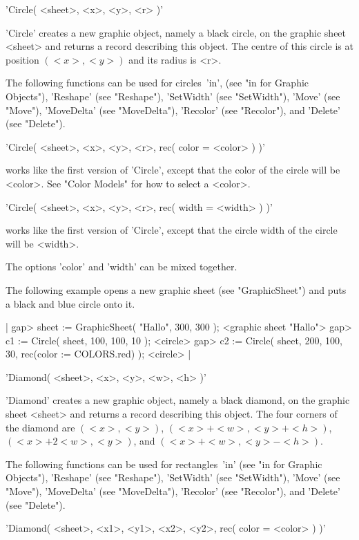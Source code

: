 'Circle( <sheet>, <x>, <y>, <r> )'

'Circle'  creates a  new  graphic object, namely a  black  circle, on the
graphic sheet <sheet> and returns a {\GAP} record describing this object.
The centre of  this circle is at position  $(<x>,<y>)$ and its  radius is
<r>.

The following functions can  be used for  circles\:\  'in', (see "in  for
Graphic   Objects"),   'Reshape'   (see   "Reshape"),   'SetWidth'   (see
"SetWidth"), 'Move'  (see   "Move"),  'MoveDelta'    (see   "MoveDelta"),
'Recolor' (see "Recolor"), and 'Delete' (see "Delete").

'Circle( <sheet>, <x>, <y>, <r>, rec( color \:= <color> ) )'

works like the first  version of 'Circle',  except that the color  of the
circle will be <color>.  See "Color Models" for how to select a <color>.

'Circle( <sheet>, <x>, <y>, <r>, rec( width \:= <width> ) )'

works like the first version of 'Circle', except that the circle width of
the circle will be <width>.

The options 'color' and 'width' can be mixed together.

The following example opens a  new graphic sheet (see "GraphicSheet") and
puts a black and blue circle onto it.

|    gap> sheet := GraphicSheet( "Hallo", 300, 300 );
    <graphic sheet "Hallo">
    gap> c1 := Circle( sheet, 100, 100, 10 );
    <circle>
    gap> c2 := Circle( sheet, 200, 100, 30, rec(color := COLORS.red) );
    <circle> |


'Diamond( <sheet>, <x>, <y>, <w>, <h> )'

'Diamond' creates a  new graphic object, namely  a black diamond, on  the
graphic sheet <sheet> and returns a {\GAP} record describing this object.
The  four corners  of  the diamond  are $(<x>,<y>)$, $(<x>+<w>,<y>+<h>)$,
$(<x>+2<w>,<y>)$, and $(<x>+<w>,<y>-<h>)$.

The  following functions can be used  for rectangles\:\ 'in' (see "in for
Graphic   Objects"),  'Reshape'    (see   "Reshape"),   'SetWidth'   (see
"SetWidth"),   'Move'    (see "Move"),  'MoveDelta'    (see "MoveDelta"),
'Recolor' (see "Recolor"), and 'Delete' (see "Delete").

'Diamond( <sheet>, <x1>, <y1>, <x2>, <y2>, rec( color \:= <color> ) )'

